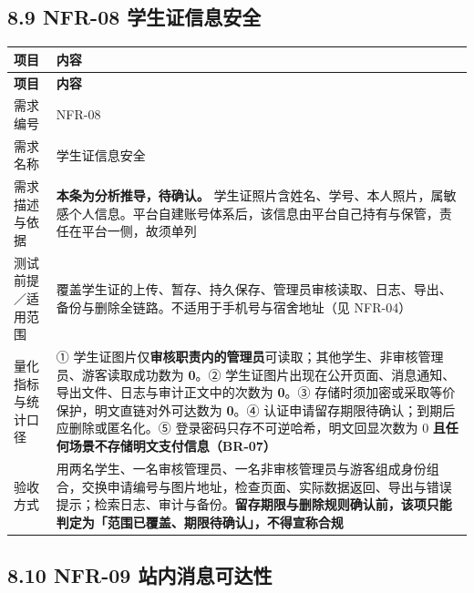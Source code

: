 \documentclass[12pt,a4paper]{ctexart}
\begin{document}
\subsection*{8.9 NFR-08 学生证信息安全}

{\scriptsize
\begin{longtable}{|p{2.75cm}|p{13.25cm}|}
\hline
\textbf{项目} & \textbf{内容} \\
\hline
\endfirsthead
\hline
\textbf{项目} & \textbf{内容} \\
\hline
\endhead
\hline
\endfoot
需求编号 & NFR-08 \\
\hline
需求名称 & 学生证信息安全 \\
\hline
需求描述与依据 & \textbf{本条为分析推导，待确认。} 学生证照片含姓名、学号、本人照片，属敏感个人信息。平台自建账号体系后，该信息由平台自己持有与保管，责任在平台一侧，故须单列 \\
\hline
测试前提／适用范围 & 覆盖学生证的上传、暂存、持久保存、管理员审核读取、日志、导出、备份与删除全链路。不适用于手机号与宿舍地址（见 NFR-04） \\
\hline
量化指标与统计口径 & ① 学生证图片仅\textbf{审核职责内的管理员}可读取；其他学生、非审核管理员、游客读取成功数为 \textbf{0}。② 学生证图片出现在公开页面、消息通知、导出文件、日志与审计正文中的次数为 \textbf{0}。③ 存储时须加密或采取等价保护，明文直链对外可达数为 \textbf{0}。④ 认证申请留存期限待确认；到期后应删除或匿名化。⑤ 登录密码只存不可逆哈希，明文回显次数为 0 \textbf{且任何场景不存储明文支付信息（BR-07）} \\
\hline
验收方式 & 用两名学生、一名审核管理员、一名非审核管理员与游客组成身份组合，交换申请编号与图片地址，检查页面、实际数据返回、导出与错误提示；检索日志、审计与备份。\textbf{留存期限与删除规则确认前，该项只能判定为「范围已覆盖、期限待确认」，不得宣称合规} \\
\hline
\end{longtable}
}


\subsection*{8.10 NFR-09 站内消息可达性}
\end{document}
